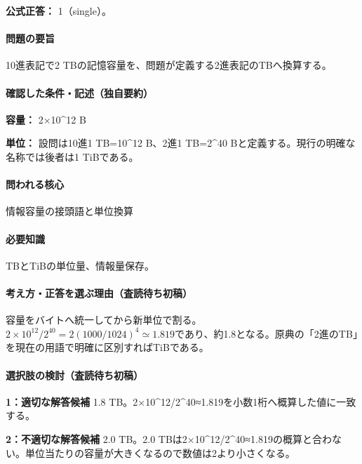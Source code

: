 \textbf{公式正答：} 1（single）。

\paragraph{問題の要旨} 10進表記で2 TBの記憶容量を、問題が定義する2進表記のTBへ換算する。

\paragraph{確認した条件・記述（独自要約）}\mbox{}\par

\noindent\textbf{容量：} 2×10\textasciicircum{}12 B\par

\noindent\textbf{単位：} 設問は10進1 TB=\allowbreak{}10\textasciicircum{}12 B、2進1 TB=\allowbreak{}2\textasciicircum{}40 Bと定義する。現行の明確な名称では後者は1 TiBである。\par

\paragraph{問われる核心} 情報容量の接頭語と単位換算

\paragraph{必要知識} TBとTiBの単位量、情報量保存。

\paragraph{考え方・正答を選ぶ理由（査読待ち初稿）} 容量をバイトへ統一してから新単位で割る。\(2\times10^{12}/2^{40}=2(1000/1024)^4\simeq1.819\)であり、約1.8となる。原典の「2進のTB」を現在の用語で明確に区別すればTiBである。

\paragraph{選択肢の検討（査読待ち初稿）}\mbox{}\par

\noindent\textbf{1：適切な解答候補} 1.8 TB。2×10\textasciicircum{}12/2\textasciicircum{}40≈1.819を小数1桁へ概算した値に一致する。\par

\noindent\textbf{2：不適切な解答候補} 2.0 TB。2.0 TBは2×10\textasciicircum{}12/2\textasciicircum{}40≈1.819の概算と合わない。単位当たりの容量が大きくなるので数値は2より小さくなる。\par


